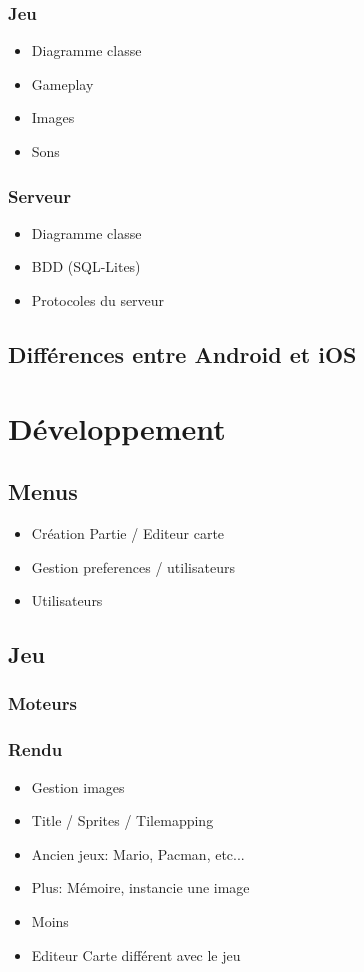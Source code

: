 \documentclass[]{report}
\begin{document}
		\subsection{Jeu}
			\begin{itemize}
				\item{Diagramme classe}
				\item{Gameplay}
				\item{Images}
				\item{Sons}
			\end{itemize}
			
		\subsection{Serveur}
			\begin{itemize}
				\item{Diagramme classe}
				\item{BDD (SQL-Lites)}
				\item{Protocoles du serveur}
			\end{itemize}
			
	\section{Différences entre Android et iOS}
	


\chapter{Développement}
	\section{Menus}
		\begin{itemize}
			\item{Création Partie / Editeur carte}
			\item{Gestion preferences / utilisateurs}
			\item{Utilisateurs}
		\end{itemize}
	\section{Jeu}
		\subsection{Moteurs}
			\subsection{Rendu}
				\begin{itemize}
					\item{Gestion images}
					\item{Title / Sprites / Tilemapping}
					\item{Ancien jeux: Mario, Pacman, etc...}
					\item{Plus: Mémoire, instancie une image}
					\item{Moins}
					\item{Editeur Carte différent avec le jeu}
				\end{itemize}
\end{document}
